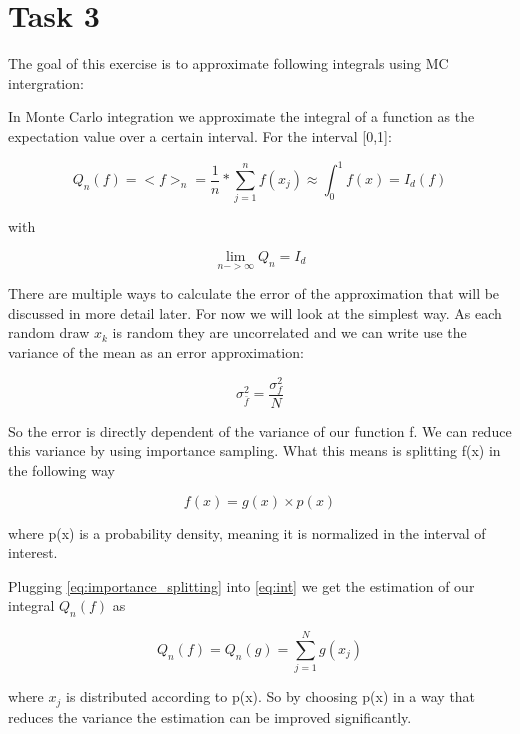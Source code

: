 \documentclass[a4paper, 11pt]{article}          %
\begin{document}
    \section{Task 3}\label{sec:task-3}

    The goal of this exercise is to approximate following integrals using MC intergration:

    In Monte Carlo integration we approximate the integral of a function as the expectation value over a certain interval. For the interval [0,1]:

    \begin{equation}
        \label{eq:int}
        Q_n(f) = <f>_n = \frac{1}{n}*\sum_{j=1}^{n} f(x_j) \approx \int_{0}^{1} f(x)= I_d(f)
    \end{equation}

    with

    \begin{equation*}
        \lim_{n->\infty} Q_n = I_d
    \end{equation*}

    There are multiple ways to calculate the error of the approximation that will be discussed in more detail later. For now we will look at the simplest way. As each random draw $x_k$ is random they are uncorrelated and we can write use the variance of the mean as an error approximation:

    \begin{equation*}
        \sigma_{\bar{f}}^2 = \frac{\sigma_f^2}{N}
    \end{equation*}

    So the error is directly dependent of the variance of our function f. We can reduce this variance by using importance sampling. What this means is splitting f(x) in the following way

    \begin{equation}
        \label{eq:importance_splitting}
        f(x) = g(x) \times p(x)
    \end{equation}

    where p(x) is a probability density, meaning it is normalized in the interval of interest.

    Plugging \eqref{eq:importance_splitting} into \eqref{eq:int} we get the estimation of our integral $Q_n(f)$ as

    \begin{equation*}
        Q_n(f)=Q_n(g)=\sum_{j=1}^N g(x_j)
    \end{equation*}

    where $x_j$ is distributed according to p(x).
    So by choosing p(x) in a way that reduces the variance the estimation can be improved significantly.
\end{document}
